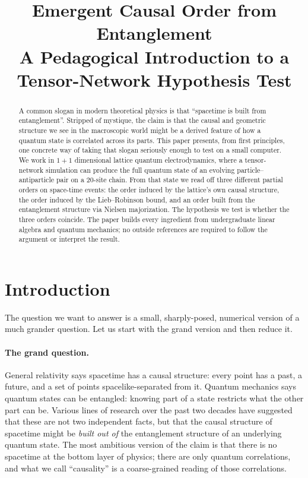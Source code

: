 \documentclass[11pt,a4paper]{article}
\title{Emergent Causal Order from Entanglement\\
\large A Pedagogical Introduction to a Tensor-Network Hypothesis Test}
\author{}
\date{}
\theoremstyle{definition}
\theoremstyle{plain}
\theoremstyle{remark}
\begin{document}
\maketitle

\begin{abstract}
A common slogan in modern theoretical physics is that ``spacetime is built
from entanglement''.  Stripped of mystique, the claim is that the causal
and geometric structure we see in the macroscopic world might be a
derived feature of how a quantum state is correlated across its parts.
This paper presents, from first principles, one concrete way of taking
that slogan seriously enough to test on a small computer.  We work in
$1{+}1$ dimensional lattice quantum electrodynamics, where a
tensor-network simulation can produce the full quantum state of an
evolving particle--antiparticle pair on a $20$-site chain.  From that
state we read off three different partial orders on space-time events:
the order induced by the lattice's own causal structure, the order
induced by the Lieb--Robinson bound, and an order built from the
entanglement structure via Nielsen majorization.  The hypothesis we
test is whether the three orders coincide.  The paper builds every
ingredient from undergraduate linear algebra and quantum mechanics; no
outside references are required to follow the argument or interpret
the result.
\end{abstract}

\tableofcontents

\section{Introduction}\label{sec:intro}

The question we want to answer is a small, sharply-posed, numerical
version of a much grander question.  Let us start with the grand
version and then reduce it.

\paragraph{The grand question.}
General relativity says spacetime has a causal structure: every point
has a past, a future, and a set of points spacelike-separated from it.
Quantum mechanics says quantum states can be entangled: knowing part of
a state restricts what the other part can be.  Various lines of
research over the past two decades have suggested that these are not
two independent facts, but that the causal structure of spacetime
might be \emph{built out of} the entanglement structure of an
underlying quantum state.  The most ambitious version of the claim is
that there is no spacetime at the bottom layer of physics; there are
only quantum correlations, and what we call ``causality'' is a
coarse-grained reading of those correlations.
\end{document}
